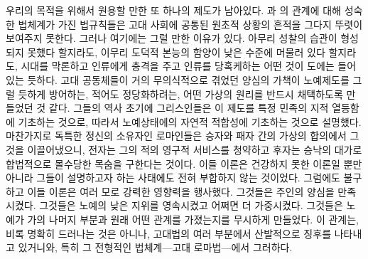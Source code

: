 우리의 목적을 위해서 원용할 만한 또 하나의  제도가 남아있다.
과 의 관계에 대해 성숙한 법체계가 가진 법규칙들은
고대 사회에 공통된 원초적 상황의 흔적을 그다지 뚜렷이 보여주지 못한다.
그러나 여기에는 그럴 만한 이유가 있다.
아무리 성찰의 습관이 형성되지 못했다 할지라도,
이무리 도덕적 본능의 함양이 낮은 수준에 머물러 있다 할지라도,
시대를 막론하고 인류에게 충격을 주고 인류를 당혹케하는 어떤 것이
도에는 들어있는 듯하다.
고대 공동체들이 거의 무의식적으로 겪었던 양심의 가책이
노예제도를 그럴 듯하게 방어하는, 적어도 정당화하려는,
어떤 가상의 원리를
반드시
채택하도록 만들었던 것 같다.
그들의 역사 초기에 그리스인들은
이 제도를
특정 민족의 지적 열등함에 기초하는 것으로,
따라서 노예상태에의 자연적 적합성에 기초하는 것으로
설명했다.
마찬가지로 독특한 정신의 소유자인 로마인들은
승자와 패자 간의 가상의 합의에서 그것을 이끌어냈으니,
전자는 그의 적의 영구적 서비스를 청약하고
후자는 승낙의 대가로 합법적으로 몰수당한 목숨을 구한다는 것이다.
이들 이론은 건강하지 못한 이론일 뿐만 아니라
그들이 설명하고자 하는 사태에도 전혀 부합하지 않는 것이었다.
그럼에도 불구하고 이들 이론은 여러 모로 강력한 영향력을 행사했다.
그것들은 주인의 양심을 만족시켰다.
그것들은 노예의 낮은 지위를 영속시켰고 어쩌면 더 가중시켰다.
그것들은 노예가 가의 나머지 부분과 원래 어떤 관계를 가졌는지를
무시하게 만들었다.
이 관계는, 비록 명확히 드러나는 것은 아니나,
고대법의 여러 부분에서 산발적으로 징후를 나타내고 있거니와,
특히 그 전형적인 법체계---고대 로마법---에서 그러하다.

